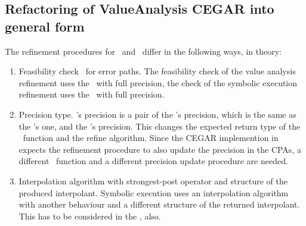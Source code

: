 \subsection{Refactoring of ValueAnalysis CEGAR into general form}
The refinement procedures for \ and \symbolicExecutionCPA\ differ in the following ways, in theory:
\begin{enumerate}
\item
Feasibility check \isFeasibleFunc\ for error paths.
The feasibility check of the value analysis refinement uses the \ with full precision, the check of the symbolic execution refinement uses the \symbolicExecutionCPA\ with full precision.

\item
Precision type. \SymbolicExecutionCPA's precision is a pair of the \symbolicValueAnalysisCPA's precision, which is the same as the 's one, and the \constraintsCPA's precision. This changes the expected return type of the \extractPrecisionFunc\ function and the refine algorithm.
Since the CEGAR implemention in \cpaChecker expects the refinement procedure to also update the precision in the CPAs, a different \extractPrecisionFunc\ function and a different
precision update procedure are needed.

\item
Interpolation algorithm with strongest-post operator and structure of the produced interpolant.
Symbolic execution uses an interpolation algorithm with another behaviour and a different structure of the returned interpolant.
This has to be considered in the \extractPrecisionFunc, also.
\end{enumerate}

